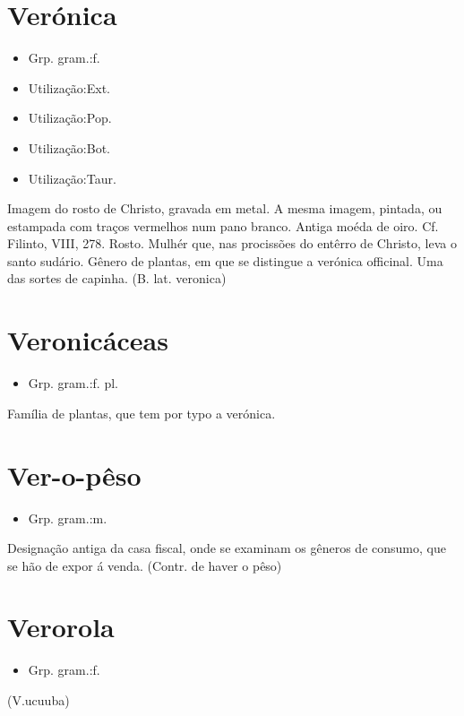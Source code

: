 \documentclass{article}
\begin{document}
\section{Verónica}
\begin{itemize}
\item {Grp. gram.:f.}
\end{itemize}
\begin{itemize}
\item {Utilização:Ext.}
\end{itemize}
\begin{itemize}
\item {Utilização:Pop.}
\end{itemize}
\begin{itemize}
\item {Utilização:Bot.}
\end{itemize}
\begin{itemize}
\item {Utilização:Taur.}
\end{itemize}
Imagem do rosto de Christo, gravada em metal.
A mesma imagem, pintada, ou estampada com traços vermelhos num pano branco.
Antiga moéda de oiro. Cf. Filinto, VIII, 278.
Rosto.
Mulhér que, nas procissões do entêrro de Christo, leva o santo sudário.
Gênero de plantas, em que se distingue a verónica officinal.
Uma das sortes de capinha.
(B. lat. \textunderscore veronica\textunderscore )
\section{Veronicáceas}
\begin{itemize}
\item {Grp. gram.:f. pl.}
\end{itemize}
Família de plantas, que tem por typo a verónica.
\section{Ver-o-pêso}
\begin{itemize}
\item {Grp. gram.:m.}
\end{itemize}
Designação antiga da casa fiscal, onde se examinam os gêneros de consumo, que se hão de expor á venda.
(Contr. de \textunderscore haver o pêso\textunderscore )
\section{Verorola}
\begin{itemize}
\item {Grp. gram.:f.}
\end{itemize}
(V.ucuuba)
\end{document}
